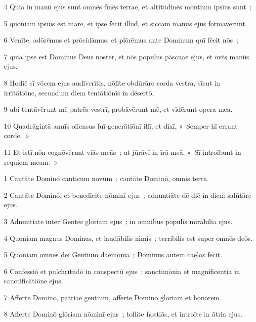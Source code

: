 \psalmVerse
  {\phantom{00}4}
  {Quia in manū ejus sunt omnēs fīnēs terrae, et altitūdinēs montium ipsīus sunt~;}


\psalmVerse
  {\phantom{00}5}
  {quoniam ipsīus est mare, et ipse fēcit illud, et siccam manūs ejus formāvērunt.}


\psalmVerse
  {\phantom{00}6}
  {Venīte, adōrēmus et prōcidāmus, et plōrēmus ante Dominum quī fēcit nōs~;}


\psalmVerse
  {\phantom{00}7}
  {quia ipse est Dominus Deus noster, et nōs populus pāscuae ejus, et ovēs manūs ejus.}


\psalmVerse
  {\phantom{00}8}
  {Hodiē sī vōcem ejus audīverītis, nōlīte obdūrāre corda vestra, sīcut in irrītātiōne, secundum diem tentātiōnis in dēsertō,}


\psalmVerse
  {\phantom{00}9}
  {ubi tentāvērunt mē patrēs vestrī, probāvērunt mē, et vīdērunt opera mea.}


\psalmVerse
  {\phantom{0}10}
  {Quadrāgintā annīs offensus fuī generātiōnī illī, et dixī, «~Semper hī errant corde.~»}


\psalmVerse
  {\phantom{0}11}
  {Et istī nōn cognōvērunt viās meās~; ut jūrāvī in īrā meā, «~Sī introībunt in requiem meam.~»}



\psalmVerse
  {\phantom{00}1}
  {Cantāte Dominō canticum novum~; cantāte Dominō, omnis terra.}


\psalmVerse
  {\phantom{00}2}
  {Cantāte Dominō, et benedīcite nōminī ejus~; adnuntiāte dē diē in diem salūtāre ejus.}


\psalmVerse
  {\phantom{00}3}
  {Adnuntiāte inter Gentēs glōriam ejus~; in omnibus populīs mīrābilia ejus.}


\psalmVerse
  {\phantom{00}4}
  {Quoniam magnus Dominus, et laudābilis nimis~; terribilis est super omnēs deōs.}


\psalmVerse
  {\phantom{00}5}
  {Quoniam omnēs deī Gentium daemonia~; Dominus autem caelōs fēcit.}


\psalmVerse
  {\phantom{00}6}
  {Confessiō et pulchritūdō in conspectū ejus~; sanctimōnia et magnificentia in sanctificātiōne ejus.}


\psalmVerse
  {\phantom{00}7}
  {Afferte Dominō, patriae gentium, afferte Dominō glōriam et honōrem.}


\psalmVerse
  {\phantom{00}8}
  {Afferte Dominō glōriam nōminī ejus~; tollite hostiās, et introīte in ātria ejus.}


